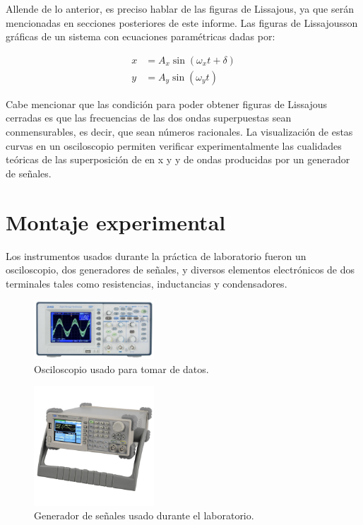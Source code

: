 \documentclass[prb,aps,twocolumn,preprintnumbers,amsmath,amssymb]{revtex4}
\begin{document}
Allende de lo anterior, es preciso hablar de las figuras de Lissajous, ya que serán mencionadas en secciones posteriores de este informe. Las figuras de Lissajous\footnotemark[2] son gráficas de un sistema con ecuaciones paramétricas dadas por:

\begin{equation}
\label{lissa}
\begin{split}
x &= A_{x}\sin(\omega_{x}t + \delta)\\
y &= A_{y}\sin(\omega_{y}t)
\end{split}
\end{equation}

Cabe mencionar que las condición para poder obtener figuras de Lissajous cerradas es que las frecuencias de las dos ondas superpuestas sean conmensurables, es decir, que sean números racionales. La visualización de estas curvas en un osciloscopio permiten verificar experimentalmente las cualidades teóricas de las superposición de en x y y de ondas producidas por un generador de señales.

\section{Montaje experimental}

Los instrumentos usados durante la práctica de laboratorio fueron un osciloscopio, dos generadores de señales, y diversos elementos electrónicos de dos terminales tales como resistencias, inductancias y condensadores.\\

\begin{figure}[h!]
	\centering
	\includegraphics[width=0.4\textwidth]{osci}
	\caption{Osciloscopio usado para tomar de datos.}
	\label{fig: osci}
\end{figure}

\begin{figure}[h!]
	\centering
	\includegraphics[width=0.4\textwidth,height=0.25\textheight]{generador}
	\caption{Generador de señales usado durante el laboratorio.}
	\label{fig: genr}
\end{figure}
\end{document}
